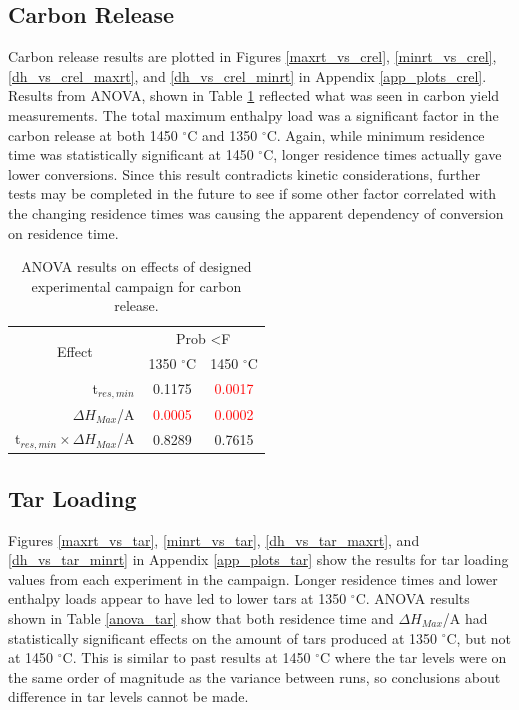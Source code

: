 \documentclass[11pt,twocolumn]{article}
\begin{document}

\subsection*{Carbon Release}

Carbon release results are plotted in Figures \ref{maxrt_vs_crel}, \ref{minrt_vs_crel}, \ref{dh_vs_crel_maxrt}, and \ref{dh_vs_crel_minrt} in Appendix \ref{app_plots_crel}.  Results from ANOVA, shown in Table \ref{anova_crel} reflected what was seen in carbon yield measurements.  The total maximum enthalpy load was a significant factor in the carbon release at both 1450 $^\circ$C and 1350 $^\circ$C.  Again, while minimum residence time was statistically significant at 1450 $^\circ$C, longer residence times actually gave lower conversions.  Since this result contradicts kinetic considerations, further tests may be completed in the future to see if some other factor correlated with the changing residence times was causing the apparent dependency of conversion on residence time.

\begin{table}
	\centering
	\caption{ANOVA results on effects of designed experimental campaign for carbon release.}
	\begin{tabular}{r c c}
		\toprule
		\multicolumn{1}{c}{\multirow{2}{*}{Effect}}		& 	\multicolumn{2}{c}{Prob \textless F	}	\\
		{}								&	1350 $^\circ$C			&	1450 $^\circ$C			\\
		\midrule
		t$_{res,min}$						&	0.1175				&	\textcolor{red}{0.0017}	\\
		$\Delta H_{Max}$/A					&	\textcolor{red}{0.0005}	&	\textcolor{red}{0.0002}	\\
		t$_{res,min}\times \Delta H_{Max}$/A	&	0.8289				&	0.7615				\\
		\bottomrule
	\end{tabular}
	\label{anova_crel}
\end{table}


\subsection*{Tar Loading}

Figures \ref{maxrt_vs_tar}, \ref{minrt_vs_tar}, \ref{dh_vs_tar_maxrt}, and \ref{dh_vs_tar_minrt} in Appendix \ref{app_plots_tar} show the results for tar loading values from each experiment in the campaign.  Longer residence times and lower enthalpy loads appear to have led to lower tars at 1350 $^\circ$C.  ANOVA results shown in Table \ref{anova_tar} show that both residence time and $\Delta H_{Max}$/A had statistically significant effects on the amount of tars produced at 1350 $^\circ$C, but not at 1450 $^\circ$C.  This is similar to past results at 1450 $^\circ$C where the tar levels were on the same order of magnitude as the variance between runs, so conclusions about difference in tar levels cannot be made.
\end{document}
